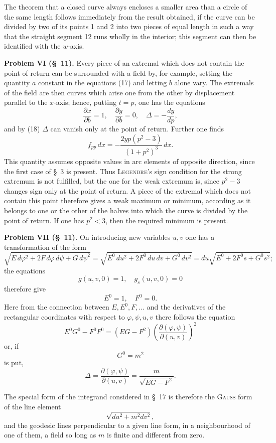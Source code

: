 \documentclass[11pt,a4paper,leqno]{article}
\begin{document}
The theorem that a closed curve always encloses a smaller area than a circle of the same length follows immediately from the result obtained, if the curve can be divided by two of its points 1 and 2 into two pieces of equal length in such a way that the straight segment 12 runs wholly in the interior; this segment can then be identified with the $w$-axis.

\bigskip

\noindent\textbf{Problem VI (\S~11).} Every piece of an extremal which does not contain the point of return can be surrounded with a field
by, for example, setting the quantity $a$ constant in the equations (17) and letting $b$ alone vary. The extremals of the field are then curves which arise one from the other by displacement parallel to the $x$-axis; hence, putting $t=p$, one has the equations
\[
\frac{\partial x}{\partial b}=1,\quad
\frac{\partial y}{\partial b}=0,\quad
\Delta=-\frac{dy}{dp},
\]
and by (18) $\Delta$ can vanish only at the point of return. Further one finds
\[
f_{pp}\,dx=-\frac{2yp(p^2-3)}{(1+p^2)^3}\,dx.
\]
This quantity assumes opposite values in arc elements of opposite direction, since the first case of \S~3 is present. Thus \textsc{Legendre}'s sign condition for the strong extremum is not fulfilled, but the one for the weak extremum is, since $p^2-3$ changes sign only at the point of return. A piece of the extremal which does not contain this point therefore gives a weak maximum or minimum, according as it belongs to one or the other of the halves into which the curve is divided by the point of return. If one has $p^2<3$, then the required minimum is present.

\bigskip

\noindent\textbf{Problem VII (\S~11).} On introducing new variables $u,v$ one has a transformation of the form
\[
\sqrt{E\,d\varphi^2+2F\,d\varphi\,d\psi+G\,d\psi^2}
=
\sqrt{E^0\,du^2+2F^0\,du\,dv+G^0\,dv^2}
=
du\sqrt{E^0+2F^0s+G^0s^2};
\]
the equations
\[
g(u,v,0)=1,\quad g_s(u,v,0)=0
\]
therefore give
\[
E^0=1,\quad F^0=0.
\]
Here from the connection between $E,E^0,F,\ldots$ and the derivatives of the rectangular coordinates with respect to $\varphi,\psi,u,v$ there follows the equation
\[
E^0G^0-F^0F^0=(EG-F^2)\left(\frac{\partial(\varphi,\psi)}{\partial(u,v)}\right)^2
\]
or, if
\[
G^0=m^2
\]
is put,
\[
\Delta=\frac{\partial(\varphi,\psi)}{\partial(u,v)}
=\frac{m}{\sqrt{EG-F^2}}.
\]

The special form of the integrand considered in \S~17 is therefore the \textsc{Gauss} form of the line element
\[
\sqrt{du^2+m^2dv^2},
\]
and the geodesic lines perpendicular to a given line form, in a neighbourhood of one of them, a field so long as $m$ is finite and different from zero.
\end{document}
